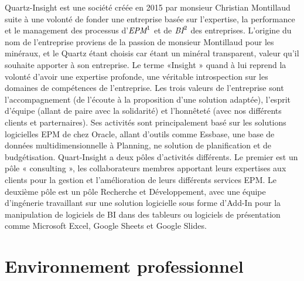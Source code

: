 \documentclass[a4paper, 11pt]{report}
\begin{document}
Quartz-Insight est une société créée en 2015 par monsieur Christian Montillaud suite à une volonté de fonder une entreprise basée sur l’expertise,  la performance et le management des processus d’$\emph{EPM}^1$ et de $\emph{BI}^2$ des entreprises.
L’origine du nom de l’entreprise proviens de la passion de monsieur  Montillaud pour les minéraux, et le Quartz étant choisis car étant un minéral transparent, valeur qu’il souhaite apporter à son entreprise.
Le terme «Insight » quand à lui reprend la volonté d’avoir une expertise profonde, une véritable introspection sur les domaines de compétences de l’entreprise.
\newline
\newline
Les trois valeurs de l’entreprise sont l’accompagnement (de l’écoute à la proposition d’une solution adaptée), l’esprit d’équipe (allant de paire avec la solidarité) et l’honnêteté (avec nos différents clients et parternaires).
\newline
\newline
Ses activités sont principalement basé sur les solutions logicielles EPM  de chez Oracle, allant d’outils comme Essbase, une base de données multidimensionnelle à Planning, ne solution de planification et de budgétisation.
Quart-Insight a deux pôles d’activités différents.
Le premier est un pôle « consulting », les collaborateurs membres apportant leurs expertises aux clients pour la gestion et l’amélioration de leurs différents services EPM.
Le deuxième pôle est un pôle Recherche et Développement, avec une équipe d’ingénerie travaillant sur une solution logicielle sous forme d’Add-In pour la manipulation de logiciels de BI dans des tableurs ou logiciels de présentation comme Microsoft Excel, Google Sheets et Google Slides.    
\clearpage

\chapter{Environnement professionnel}
\end{document}
